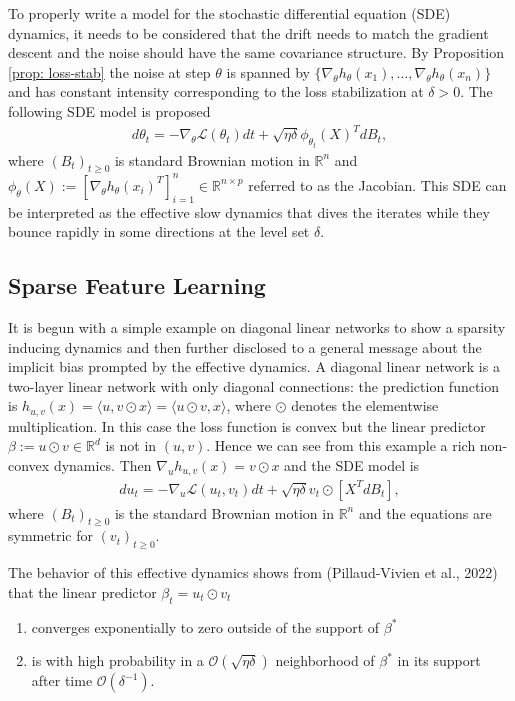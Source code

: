 To properly write a model for the stochastic differential equation (SDE)
dynamics, it needs to be considered that the drift needs to match the
gradient descent and the noise should have the same covariance structure. By
Proposition \ref{prop: loss-stab} the noise at step $\theta$ is spanned by
$\{\nabla_{\theta}h_{\theta}(x_1),\ldots,\nabla_{\theta}h_{\theta}(x_n)\}$
and has constant intensity corresponding to the loss stabilization at $\delta
>0$. The following SDE model is proposed
\begin{align}
    d\theta_t = -\nabla_{\theta} \mathcal{L}(\theta_t)dt + \sqrt{\eta\delta}
    \phi_{\theta_t}(X)^{T}dB_t,
\end{align}
where $(B_t)_{t\ge 0}$ is standard Brownian motion in $\mathbb{R}^{n}$ and
$\phi_{\theta}(X) := [\nabla_{\theta}h_{\theta}(x_i)^{T}]_{i=1}^{n} \in
\mathbb{R}^{n\times p}$ referred to as the Jacobian. This SDE can be
interpreted as the effective slow dynamics that dives the iterates while they
bounce rapidly in some directions at the level set $\delta$.
\subsection{Sparse Feature Learning}
It is begun with a simple example on diagonal linear networks to show a
sparsity inducing dynamics and then further disclosed to a general message
about the implicit bias prompted by the effective dynamics.
\newline
A diagonal linear network is a two-layer linear network with only diagonal
connections: the prediction function is $h_{u,v}(x) = \langle u, v \odot
x\rangle = \langle u \odot v, x\rangle$, where $\odot$ denotes the
elementwise multiplication. In this case the loss function is convex but the
linear predictor $\beta:=u\odot v \in \mathbb{R}^{d}$ is not in $(u, v)$.
Hence we can see from this example a rich non-convex dynamics. Then $\nabla_u
h_{u, v}(x) = v \odot x$  and the SDE model is
\begin{align}
    du_t = -\nabla_u \mathcal{L}(u_t, v_t) dt + \sqrt{\eta\delta} v_t \odot
    [X^{T}dB_t],
\end{align}
where $(B_t)_{t\ge 0}$ is the standard Brownian motion in $\mathbb{R}^{n}$
and the equations are symmetric for $(v_t)_{t\ge 0}$.

The behavior of this effective dynamics shows from (Pillaud-Vivien et al.,
2022) that the linear predictor $\beta_t = u_t \odot v_t$
\begin{enumerate}
    \item converges exponentially to zero outside of the support of $\beta^{*}$
    \item is with high probability in a $\mathcal{O}(\sqrt{\eta\delta})$
        neighborhood of $\beta^{*}$ in its support after time
        $\mathcal{O}( \delta^{-1})$.
\end{enumerate}

